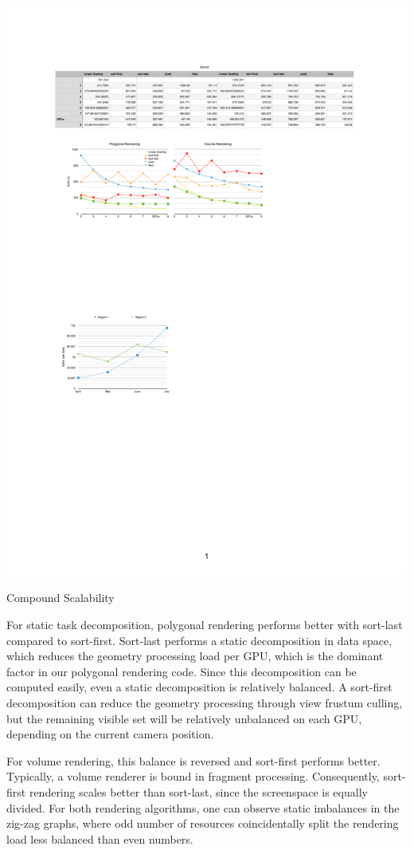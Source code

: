\begin{benchmark}[h!t]\center
 \includegraphics[width=\columnwidth]{results/static}
 {\caption{\label{rStatic}Compound Scalability}}
\end{benchmark}


For static task decomposition, polygonal rendering performs better with
sort-last compared to sort-first. Sort-last performs a static decomposition in
data space, which reduces the geometry processing load per GPU, which is the
dominant factor in our polygonal rendering code. Since this decomposition can
be computed easily, even a static decomposition is relatively balanced. A
sort-first decomposition can reduce the geometry processing through view
frustum culling, but the remaining visible set will be relatively unbalanced on
each GPU, depending on the current camera position.

For volume rendering, this balance is reversed and sort-first performs better.
Typically, a volume renderer is bound in fragment processing. Consequently,
sort-first rendering scales better than sort-last, since the screenspace is
equally divided. For both rendering algorithms, one can observe static
imbalances in the zig-zag graphs, where odd number of resources coincidentally
split the rendering load less balanced than even numbers.


